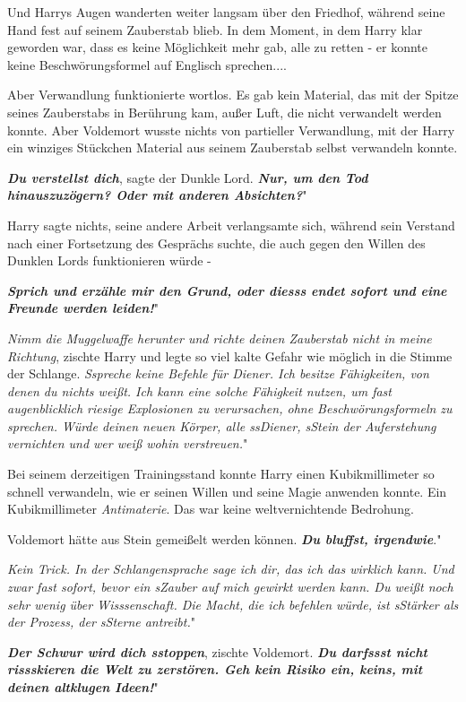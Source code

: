 Und Harrys Augen wanderten weiter langsam über den Friedhof, während seine Hand
fest auf seinem Zauberstab blieb. In dem Moment, in dem Harry klar geworden war,
dass es keine Möglichkeit mehr gab, alle zu retten - er konnte keine
Beschwörungsformel auf Englisch sprechen....

Aber Verwandlung funktionierte wortlos. Es gab kein Material, das mit der Spitze
seines Zauberstabs in Berührung kam, außer Luft, die nicht verwandelt werden
konnte. Aber Voldemort wusste nichts von partieller Verwandlung, mit der Harry
ein winziges Stückchen Material aus seinem Zauberstab selbst verwandeln konnte.

\glqq{}\textbf{\emph{Du verstellst dich}}\grqq{}, sagte der Dunkle Lord. \glqq{}
\textbf{\emph{Nur, um den Tod hinauszuzögern? Oder mit anderen Absichten?}}"

Harry sagte nichts, seine andere Arbeit verlangsamte sich, während sein Verstand
nach einer Fortsetzung des Gesprächs suchte, die auch gegen den Willen des
Dunklen Lords funktionieren würde -

\glqq{}\textbf{\emph{Sprich und erzähle mir den Grund, oder diesss endet sofort
und eine Freunde werden leiden!}}"

\glqq{}\emph{Nimm die Muggelwaffe herunter und richte deinen Zauberstab nicht in
meine Richtung}\grqq{}, zischte Harry und legte so viel kalte Gefahr wie möglich
in die Stimme der Schlange. \glqq{}\emph{Sspreche keine Befehle für Diener. Ich
besitze Fähigkeiten, von denen du nichts weißt. Ich kann eine solche Fähigkeit
nutzen, um fast augenblicklich riesige Explosionen zu verursachen, ohne
Beschwörungsformeln zu sprechen. Würde deinen neuen Körper, alle ssDiener,
sStein der Auferstehung vernichten und wer weiß wohin verstreuen.}"

Bei seinem derzeitigen Trainingsstand konnte Harry einen Kubikmillimeter so
schnell verwandeln, wie er seinen Willen und seine Magie anwenden konnte. Ein
Kubikmillimeter \emph{Antimaterie}. Das war keine weltvernichtende Bedrohung.

Voldemort hätte aus Stein gemeißelt werden können. \glqq{}\textbf{\emph{Du
bluffst, irgendwie}}."

\glqq{}\emph{Kein Trick. In der Schlangensprache sage ich dir, das ich das
wirklich kann. Und zwar fast sofort, bevor ein sZauber auf mich gewirkt werden
kann. Du weißt noch sehr wenig über Wisssenschaft. Die Macht, die ich befehlen
würde, ist sStärker als der Prozess, der sSterne antreibt.}"

\glqq{}\textbf{\emph{Der Schwur wird dich sstoppen}}\grqq{}, zischte Voldemort.
\glqq{}\textbf{\emph{Du darfssst nicht rissskieren die Welt zu zerstören. Geh
kein Risiko ein, keins, mit deinen altklugen Ideen!}}"

